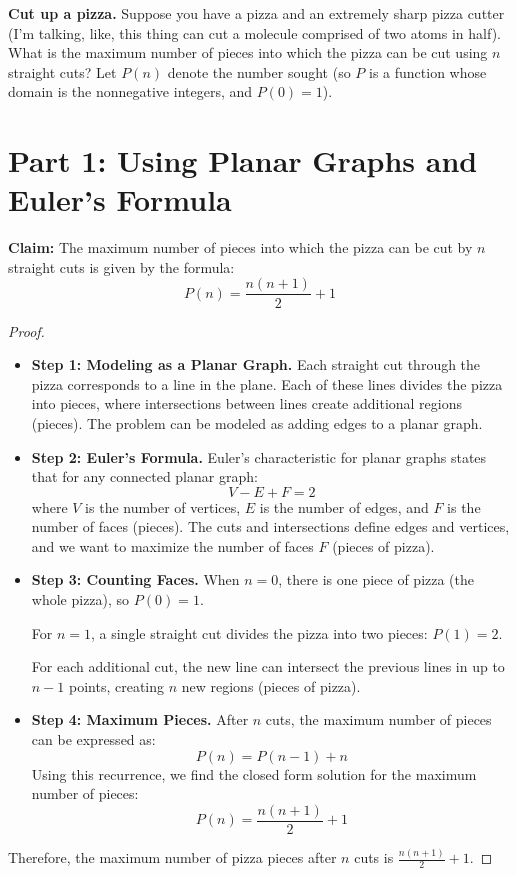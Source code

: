\documentclass[10pt, AMS Euler]{article}
\begin{document}
		\item {\bf Cut up a pizza.}  Suppose you have a pizza and an extremely sharp pizza cutter (I'm talking, like, this thing can cut a molecule comprised of two atoms in half).  
		What is the maximum number of pieces into which the pizza can be cut using $n$ straight cuts?  Let $P(n)$ denote the 
		number sought (so $P$ is a function whose domain is the nonnegative integers, and $P(0) =1$).
		
		\section*{Part 1: Using Planar Graphs and Euler’s Formula}

\noindent\textbf{Claim:} The maximum number of pieces into which the pizza can be cut by $n$ straight cuts is given by the formula:
    \[
    P(n) = \frac{n(n+1)}{2} + 1
    \]
    
    \begin{proof}
        \begin{itemize}
            \item \textbf{Step 1: Modeling as a Planar Graph.} Each straight cut through the pizza corresponds to a line in the plane. Each of these lines divides the pizza into pieces, where intersections between lines create additional regions (pieces). The problem can be modeled as adding edges to a planar graph.
    
            \item \textbf{Step 2: Euler’s Formula.} Euler’s characteristic for planar graphs states that for any connected planar graph:
            \[
            V - E + F = 2
            \]
            where $V$ is the number of vertices, $E$ is the number of edges, and $F$ is the number of faces (pieces). The cuts and intersections define edges and vertices, and we want to maximize the number of faces $F$ (pieces of pizza).
    
            \item \textbf{Step 3: Counting Faces.} When $n = 0$, there is one piece of pizza (the whole pizza), so $P(0) = 1$.
    
            For $n = 1$, a single straight cut divides the pizza into two pieces: $P(1) = 2$.
    
            For each additional cut, the new line can intersect the previous lines in up to $n-1$ points, creating $n$ new regions (pieces of pizza).
    
            \item \textbf{Step 4: Maximum Pieces.} After $n$ cuts, the maximum number of pieces can be expressed as:
            \[
            P(n) = P(n-1) + n
            \]
            Using this recurrence, we find the closed form solution for the maximum number of pieces:
            \[
            P(n) = \frac{n(n+1)}{2} + 1
            \]
        \end{itemize}
        
        Therefore, the maximum number of pizza pieces after $n$ cuts is $\frac{n(n+1)}{2} + 1$.
    \end{proof}
    
\end{document}
